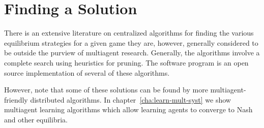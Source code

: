 \section{Finding a Solution}

There is an extensive literature on centralized algorithms for finding
the various equilibrium strategies for a given game they are, however,
generally considered to be outside the purview of multiagent research.
Generally, the algorithms involve a complete search using heuristics
for pruning.  The  software program \cite{mckelvey06a} is
an open source implementation of several of these algorithms.

However, note that some of these solutions can be found by more
multiagent-friendly distributed algorithms. In
chapter~\ref{cha:learn-mult-syst} we show multiagent learning
algorithms which allow learning agents to converge to Nash and other
equilibria.


